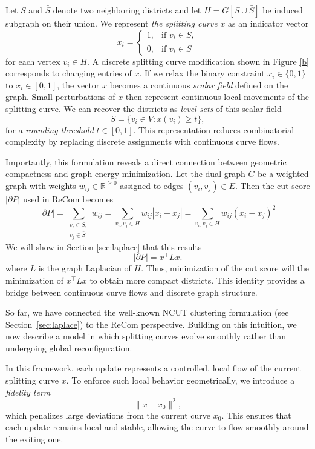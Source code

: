 \documentclass[11pt]{article}
\begin{document}
Let $S$ and $\bar S$ denote two neighboring districts and let $H = G[S \cup \bar S]$ be induced subgraph on their union. We represent \textit{the splitting curve} $x$ as an indicator vector 
\[
x_i =
\begin{cases}
1, & \text{if } v_i \in S, \\
0, & \text{if } v_i \in \bar S 
\end{cases}
\]
for each vertex $v_i \in H$. A discrete splitting curve modification shown in Figure \ref{b} corresponds to changing entries of $x$. If we relax the binary constraint $x_i \in \{0,1\}$ to $x_i \in [0,1]$, the vector $x$ becomes a continuous \textit{scalar field} defined on the graph. Small perturbations of $x$ then represent continuous local movements of the splitting curve. We can recover the districts as \textit{level sets} of this scalar field
\[
S = \{v_i \in V : x(v_i) \ge t\}, 
\]
for a \textit{rounding threshold} $t \in [0,1]$. This representation reduces combinatorial complexity by replacing discrete assignments with continuous curve flows. 

Importantly, this formulation reveals a direct connection between geometric compactness and graph energy minimization. Let the dual graph $G$ be a weighted graph with weights $w_{ij} \in \mathbb{R}^{\geq 0}$ assigned to edges $(v_i,v_j) \in E$. Then the cut score $|\partial P|$ used in ReCom becomes
\[
|\partial P|  = \sum\limits_{\substack{v_i \in S, \\ v_j \in \bar S}} w_{ij} = \sum\limits_{v_i,v_j \in H} w_{ij}|x_i - x_j| = \sum\limits_{v_i,v_j \in H} w_{ij}(x_i - x_j)^2 
\]
We will show in Section \ref{sec:laplace} that this results
\[
|\partial P| = x^\top L x.
\]
where $L$ is the graph Laplacian of $H$. Thus, minimization of the cut score will the minimization of $x^\top L x$ to obtain more compact districts. This identity provides a bridge between continuous curve flows and discrete graph structure.

So far, we have connected the well-known NCUT clustering formulation (see Section~\ref{sec:laplace}) to the ReCom perspective. Building on this intuition, we now describe a model in which splitting curves evolve smoothly rather than undergoing global reconfiguration. 

In this framework, each update represents a controlled, local flow of the current splitting curve \(x\). To enforce such local behavior geometrically, we introduce a \textit{fidelity term} 
\[
\|x - x_0\|^2,
\] 
which penalizes large deviations from the current curve \(x_0\). This ensures that each update remains local and stable, allowing the curve to flow smoothly around the exiting one. 
\end{document}
